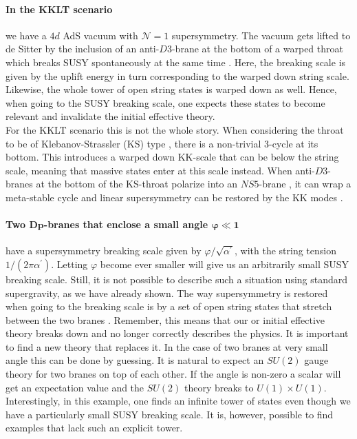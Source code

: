 \documentclass[a4paper,12pt]{report}
\begin{document}
\paragraph{In the KKLT scenario} we have a $4d$ AdS vacuum with $\mathcal{N}=1$ supersymmetry. The vacuum gets lifted to de Sitter by the inclusion of an anti-$D3$-brane at the bottom of a warped throat which breaks SUSY spontaneously at the same time \cite{Kachru:2003aw,Kachru:2003sx}. Here, the breaking scale is given by the uplift energy in turn corresponding to the warped down string scale. Likewise, the whole tower of open string states is warped down as well. Hence, when going to the SUSY breaking scale, one expects these states to become relevant and invalidate the initial effective theory.\\
For the KKLT scenario this is not the whole story. When considering the throat to be of Klebanov-Strassler (KS) type \cite{Klebanov:2000hb}, there is a non-trivial 3-cycle at its bottom. This introduces a warped down KK-scale that can be below the string scale, meaning that massive states enter at this scale instead. When anti-$D3$-branes at the bottom of the KS-throat polarize into an $NS5$-brane \cite{Kachru:2002gs}, it can wrap a meta-stable cycle and linear supersymmetry can be restored by the KK modes \cite{Aalsma:2018pll}.
\paragraph{Two $\mathbf{Dp}$-branes that enclose a small angle $\mathbf{\varphi \ll 1}$} have a supersymmetry breaking scale given by $\varphi/\sqrt{\alpha^\prime}$, with the string tension $1/(2\pi \alpha^\prime)$. Letting $\varphi$ become ever smaller will give us an arbitrarily small SUSY breaking scale. Still, it is not possible to describe such a situation using standard supergravity, as we have already shown. The way supersymmetry is restored when going to the breaking scale is by a set of open string states that stretch between the two branes \cite{Berkooz:1996km,Anastasopoulos:2011hj,Anastasopoulos:2016cmg}. Remember, this means that our or initial effective theory breaks down and no longer correctly describes the physics. It is important to find a new theory that replaces it. In the case of two branes at very small angle this can be done by guessing. It is natural to expect an $SU(2)$ gauge theory for two branes on top of each other. If the angle is non-zero a scalar will get an expectation value and the $SU(2)$ theory breaks to $U(1)\times U(1)$. Interestingly, in this example, one finds an infinite tower of states even though we have a particularly small SUSY breaking scale. It is, however, possible to find examples that lack such an explicit tower.
\end{document}
